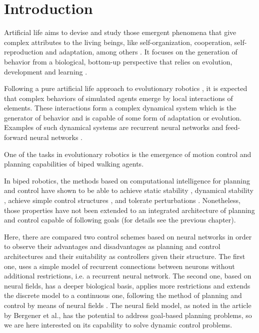 \label{ch:chp2}
\section{Introduction}

Artificial life aims to devise and study those emergent phenomena that
give complex attributes to the living beings, like self-organization,
cooperation, self-reproduction and adaptation, among others
\cite{Bedau92Philosophical}. It focuses on the generation of behavior
from a biological, bottom-up perspective that relies on evolution,
development and learning \cite{Dyer94Toward}.

Following a pure artificial life approach to evolutionary robotics
\cite{Nolfi04Evolutionary}, it is expected that complex behaviors of
simulated agents emerge by local interactions of elements. These
interactions form a complex dynamical system which is the generator of
behavior and is capable of some form of adaptation or
evolution. Examples of such dynamical systems are recurrent neural
networks \cite{Huelse04Structure} and feed-forward neural networks
\cite{Stanley02Evolving}.

One of the tasks in evolutionary robotics is the emergence of motion
control and planning capabilities of biped walking agents.

In biped robotics, the methods based on computational intelligence for
planning and control have shown to be able to achieve static stability
\cite{Kun97Adaptive}, dynamical stability
\cite{Nakanishi2004b,Komatsu05Dynamic}, achieve simple control
structures \cite{Huelse04Structure}, and tolerate perturbations
\cite{Juang02Intelligent}. Nonetheless, those properties have not been
extended to an integrated architecture of planning and control capable
of following goals (for details see the previous chapter).

Here, there are compared two control schemes based on neural networks
in order to observe their advantages and disadvantages as planning and
control architectures and their suitability as controllers given their
structure. The first one, uses a simple model of recurrent connections
between neurons without additional restrictions, i.e. a recurrent
neural network. The second one, based on neural fields, has a deeper
biological basis, applies more restrictions and extends the discrete
model to a continuous one, following the method of planning and
control by means of neural fields \cite{Bergener99Complex}. The neural
field model, as noted in the article by Bergener et al., has the
potential to address goal-based planning problems, so we are here
interested on its capability to solve dynamic control problems.

